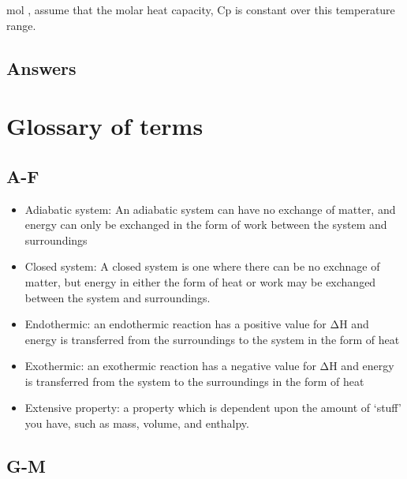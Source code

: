\documentclass[
]{book}
\begin{document}
mol , assume that the molar heat capacity, Cp is constant over this temperature range.

\hypertarget{sec:w3p2ans}{%
\section{Answers}\label{sec:w3p2ans}}

\hypertarget{glossary-of-terms}{%
\chapter*{Glossary of terms}\label{glossary-of-terms}}

\hypertarget{a-f}{%
\section*{A-F}\label{a-f}}

\begin{itemize}
\item
  Adiabatic system: An adiabatic system can have no exchange of matter, and energy can only be exchanged in the form of work between the system and surroundings
\item
  Closed system: A closed system is one where there can be no exchnage of matter, but energy in either the form of heat or work may be exchanged between the system and surroundings.
\item
  Endothermic: an endothermic reaction has a positive value for ΔH and energy is transferred from the surroundings to the system in the form of heat
\item
  Exothermic: an exothermic reaction has a negative value for ΔH and energy is transferred from the system to the surroundings in the form of heat
\item
  Extensive property: a property which is dependent upon the amount of `stuff' you have, such as mass, volume, and enthalpy.
\end{itemize}

\hypertarget{g-m}{%
\section*{G-M}\label{g-m}}
\end{document}
